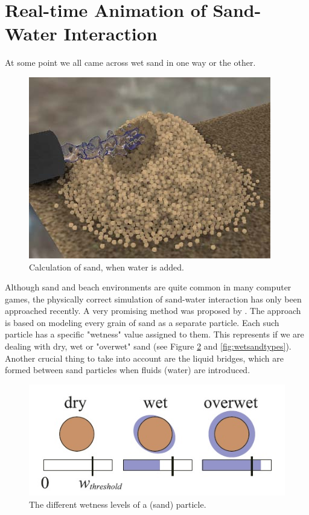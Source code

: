 \section{Real-time Animation of Sand-Water Interaction}
At some point we all came across wet sand in one way or the other. 

\begin{figure}[htb]
	\centering
	\includegraphics[width=\linewidth]{RSKN08/pileofsand.jpg}
	\caption{Calculation of sand, when water is added.}
	\label{fig:pileofsand}
\end{figure}

Although sand and beach environments are quite common in many computer games, the physically correct simulation of sand-water interaction has only been approached recently. A very promising method was proposed by \cite{rungjiratananon2008real}. The approach is based on modeling every grain of sand as a separate particle. Each such particle has a specific "wetness" value assigned to them. This represents if we are dealing with dry, wet or "overwet" sand (see Figure \ref{fig:wetness} and \ref{fig:wetsandtypes}). Another crucial thing to take into account are the liquid bridges, which are formed between sand particles when fluids (water) are introduced.

\begin{figure}[htb]
	\centering
	\includegraphics[width=\linewidth]{RSKN08/wetness.jpg}
	\caption{The different wetness levels of a (sand) particle.}
	\label{fig:wetness}
\end{figure}

